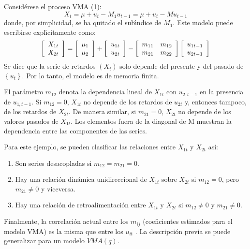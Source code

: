 \begin{ejemplo}
Consid\'{e}rese el proceso VMA (1):
\[
X_{t}=\mu +u_{t}-M_{1}u_{t-1}=\mu +u_{t}-Mu_{t-1}
\]
donde, por simplicidad, se ha quitado el sub\'{\i}ndice de $M_{1}$. Este modelo puede escribirse expl\'{\i}citamente como:
\[
\left[ {\begin{array}{*{20}c}
X_{1t}\\
X_{2t}\\
\end{array} } \right]=\left[ {\begin{array}{*{20}c}
\mu_{1}\\
\mu_{2}\\
\end{array} } \right]+\left[ {\begin{array}{*{20}c}
u_{1t}\\
u_{2t}\\
\end{array} } \right]-\left[ {\begin{array}{*{20}c}
m_{11} & m_{12}\\
m_{21} & m_{22}\\
\end{array} } \right]\left[ {\begin{array}{*{20}c}
u_{1t-1}\\
u_{2t-1}\\
\end{array} } \right]
\]
Se dice que la serie de retardos $\left( X_{t} \right)$ solo depende del presente y del pasado de $\left\{u_{t} \right\}$. Por lo tanto, el modelo es de memoria finita.\newline

El par\'{a}metro $m_{12}$ denota la dependencia lineal de $X_{1t}$ con $u_{2,t-1}$ en la presencia de $u_{1,t-1}$. Si $m_{12}=0$, $X_{1t}$ no depende de los retardos de $u_{2t}$ y, entonces tampoco, de los retardos de $X_{2t}$. De manera similar, si $m_{21}=0$, $X_{2t}$ no depende de los valores pasados de $X_{1t}$. Los elementos fuera de la diagonal de M muestran la dependencia entre las componentes de las series.\newline

Para este ejemplo, se pueden clasificar las relaciones entre $X_{1t}$ y $X_{2t}$ as\'{i}:
\begin{enumerate}
      \item Son series desacopladas si $m_{12}=m_{21}=0$.
      \item Hay una relaci\'{o}n din\'{a}mica unidireccional de $X_{1t}$ sobre $X_{2t}$ si $m_{12}=0$, pero $m_{21}\neq 0$ y viceversa.
      \item Hay una relaci\'{o}n de retroalimentaci\'{o}n entre $X_{1t}$ y $X_{2t}$ si $m_{12}\neq 0$ y $m_{21}\neq 0$.
\end{enumerate}

Finalmente, la correlaci\'{o}n actual entre los $m_{ij}$ (coeficientes estimados para el modelo VMA) es la misma que entre los $u_{it}$ . La descripci\'{o}n previa se puede generalizar para un modelo $VMA(q)$.
\end{ejemplo}


